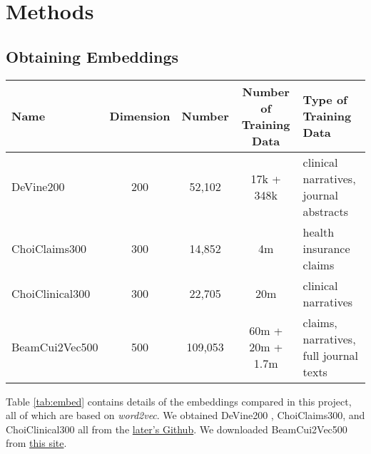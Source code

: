 \documentclass[11pt,a4paper]{article}
\begin{document}


\section{Methods}

\subsection{Obtaining Embeddings}

\begin{table*}[h!]
	\begin{center}
		\label{tab:embed}
		\begin{tabular}{l|c|c|c|l} %
			Name & Dimension & Number & Number of Training Data& Type of Training Data \\
			\hline
			DeVine200 & 200 & 52,102 & 17k + 348k &clinical narratives, journal abstracts\\
			ChoiClaims300 & 300 & 14,852& 4m&health insurance claims\\
			ChoiClinical300 & 300 & 22,705&20m& clinical narratives\\
			BeamCui2Vec500 & 500 & 109,053&60m + 20m + 1.7m& claims, narratives, full journal texts\\
		\end{tabular}
	\end{center}
\caption{Characteristics of the embeddings compared, including the name referred, the embedding dimensions, the number of embeddings in the dataset, and the type of data used to train them.}
\end{table*}

Table \ref{tab:embed} contains details of the embeddings compared in this project, all of which are based on \emph{word2vec}. We obtained DeVine200 \cite{devineMedicalSemanticSimilarity2014}, ChoiClaims300, and ChoiClinical300 \cite{choiLearningLowDimensionalRepresentations2016} all from the \href{https://github.com/clinicalml/embeddings}{later's Github}. We downloaded BeamCui2Vec500 \cite{beamClinicalConceptEmbeddings2018} from \href{https://figshare.com/s/00d69861786cd0156d81}{this site}. 
\end{document}
